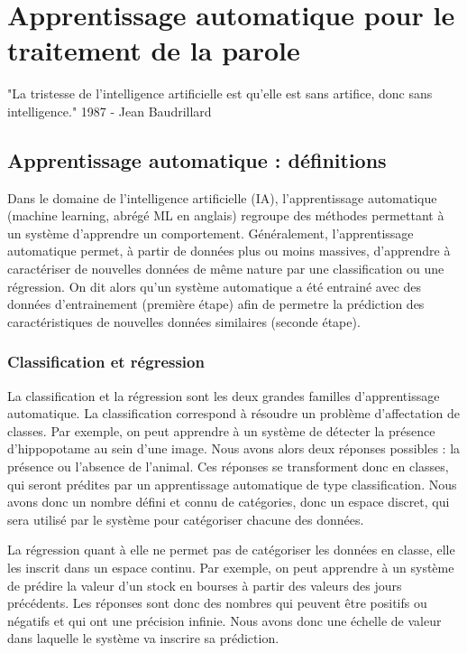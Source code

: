 \chapter{Apprentissage automatique pour le traitement de la parole}
"La tristesse de l'intelligence artificielle est qu'elle est sans artifice, donc sans intelligence." 1987 -
Jean Baudrillard

\section{Apprentissage automatique : définitions}

Dans le domaine de l'intelligence artificielle (IA), l'apprentissage automatique (machine learning, abrégé ML en anglais) regroupe des méthodes permettant à un système d'apprendre un comportement. Généralement, l'apprentissage automatique permet, à partir de données plus ou moins massives, d'apprendre à caractériser de nouvelles données de même nature par une classification ou une régression. On dit alors qu'un système automatique a été entrainé avec des données d'entrainement (première étape) afin de permetre la prédiction des caractéristiques de nouvelles données similaires (seconde étape).

\subsection{Classification et régression}
La classification et la régression sont les deux grandes familles d'apprentissage automatique.
La classification correspond à résoudre un problème d'affectation de classes. Par exemple, on peut apprendre à un système de détecter la présence d'hippopotame au sein d'une image. Nous avons alors deux réponses possibles : la présence ou l'absence de l'animal. Ces réponses se transforment donc en classes, qui seront prédites par un apprentissage automatique de type classification. Nous avons donc un nombre défini et connu de catégories, donc un espace discret, qui sera utilisé par le système pour catégoriser chacune des données.

La régression quant à elle ne permet pas de catégoriser les données en classe, elle les inscrit dans un espace continu. Par exemple, on peut apprendre à un système de prédire la valeur d'un stock en bourses à partir des valeurs des jours précédents. Les réponses sont donc des nombres qui peuvent être positifs ou négatifs et qui ont une précision infinie. Nous avons donc une échelle de valeur dans laquelle le système va inscrire sa prédiction.

